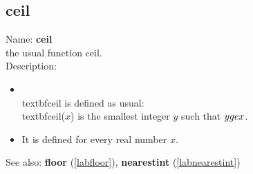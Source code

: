 \subsection{ceil}
\label{labceil}
\noindent Name: \textbf{ceil}\\
the usual function ceil.\\
\noindent Description: \begin{itemize}

\item \\textbf{ceil} is defined as usual: \\textbf{ceil}($x$) is the smallest integer $y$ such that $y \\ge x$.\n
\item It is defined for every real number $x$.\n\end{itemize}
See also: \textbf{floor} (\ref{labfloor}), \textbf{nearestint} (\ref{labnearestint})
